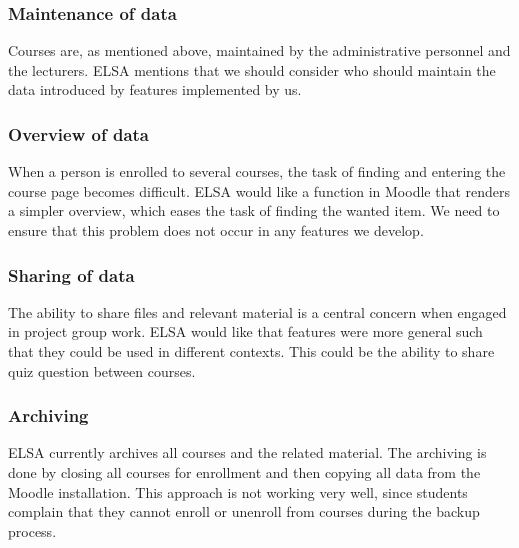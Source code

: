 \subsubsection{Maintenance of data} Courses are, as mentioned above, maintained by the administrative personnel and the lecturers.
ELSA mentions that we should consider who should maintain the data introduced by features implemented by us.


\subsubsection{Overview of data} When a person is enrolled to several courses, the task of finding and entering the course page becomes difficult. 
ELSA would like a function in Moodle that renders a simpler overview, which eases the task of finding the wanted item.
We need to ensure that this problem does not occur in any features we develop.

\subsubsection{Sharing of data} The ability to share files and relevant material is a central concern when engaged in project group work.
ELSA would like that features were more general such that they could be used in different contexts.
This could be the ability to share quiz question between courses. 

\subsubsection{Archiving} ELSA currently archives all courses and the related material. 
The archiving is done by closing all courses for enrollment and then copying all data from the Moodle installation. 
This approach is not working very well, since students complain that they cannot enroll or unenroll from courses during the backup process. 

